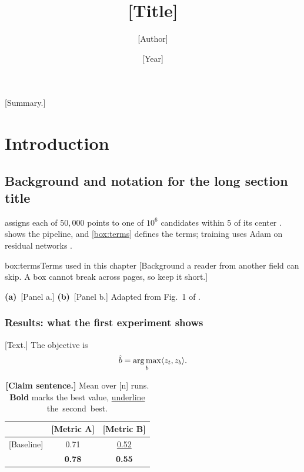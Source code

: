 \documentclass[11pt,a4paper,twoside,openright]{book}
\title{[Title]}
\author{[Author]}
\date{[Year]}
\begin{document}
\frontmatter
\maketitle
{}
[Summary.]
\tableofcontents
\listoffigures
{}

\mainmatter
\chapter{Introduction}\label{ch:intro}

\begin{contributionbox}
\end{contributionbox}

\section{Background and notation for the long section title}\label{sec:background}
\method{} assigns each of $50{,}000$ points to one of $10^{6}$ candidates
within 5\um{} of its center \citep{lecun1998gradient}. 
shows the pipeline, and \cref{box:terms} defines the terms; training uses
Adam \citep{kingma2015adam} on residual networks \citep{he2016resnet}.

\begin{infobox}{box:terms}{Terms used in this chapter}
[Background a reader from another field can skip. A box cannot break across
pages, so keep it short.]
\end{infobox}

%
  {\textbf{(a)}~[Panel a.] \textbf{(b)}~[Panel b.] Adapted from Fig.~1 of \citet{he2016resnet}.}

\subsection{Results: what the first experiment shows}\label{sec:first}
[Text.] The objective is
\begin{equation}
  \hat b = \operatorname*{arg\,max}_{b} \langle z_t, z_b \rangle .\label{eq:assign}
\end{equation}

\begin{table}[tbp]
  \caption[Comparison]{\textbf{[Claim sentence.]} Mean over [n] runs.
  \textbf{Bold} marks the best value, \underline{underline} the~second~best.}
  \label{tab:compare}
  \centering\small
  \begin{tabular}{@{}lcc@{}}
    \toprule
    & [Metric A] & [Metric B] \\
    \midrule
    {[Baseline]} & 0.71 & \underline{0.52} \\
    \method{}    & \textbf{0.78} & \textbf{0.55} \\
    \bottomrule
  \end{tabular}
\end{table}
\end{document}
